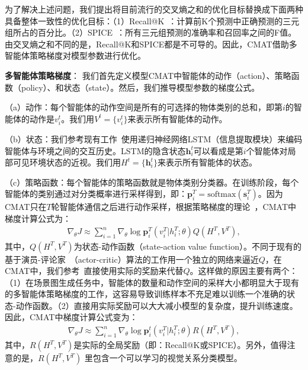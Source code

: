 为了解决上述问题，我们提出将目前流行的交叉熵之和的优化目标替换成下面两种具备整体一致性的优化目标：（1）Recall@K~\cite{lu2016visual}：计算前K个预测中正确预测的三元组所占的百分比。（2）SPICE~\cite{anderson2016spice}：所有三元组预测的准确率和召回率之间的F值。由交叉熵之和不同的是，Recall@K和SPICE都是不可导的。因此，CMAT借助多智能体策略梯度对模型参数进行优化。


\textbf{多智能体策略梯度}：
我们首先定义模型CMAT中智能体的动作（action）、策略函数（policy）、和状态（state）。然后，我们推导模型参数的梯度公式。

（a）动作：每个智能体的动作空间是所有的可选择的物体类别的总和，即第$i$的智能体的动作是$v^t_i$。我们用$V^t = \{v^t_i\}$来表示所有智能体的动作。

（b）状态：我们参考现有工作~\cite{hausknecht2015deep}使用递归神经网络LSTM（信息提取模块）来编码智能体与环境之间的交互历史。LSTM的隐含状态$\bm{h}^t_i$可以看成是第$i$个智能体对局部可见环境状态的近视。我们用$H^t = \{\bm{h}^t_i\}$来表示所有智能体的状态。


（c）策略函数：每个智能体的策略函数就是物体类别分类器。在训练阶段，每个智能体的类别通过对分类概率进行采样得到，即：$\bm{p}^T_i = \text{softmax}(\bm{s}^T_i)$。因为CMAT只在$T$轮智能体通信之后进行动作采样，根据策略梯度的理论~\cite{sutton2000policy}，CMAT中梯度计算公式为：
\begin{align}
\nabla_{\theta} J \approx \sum^n_{i=1} \nabla_{\theta} \log \bm{p}^T_i (v^T_i|h^T_i; \theta)Q(H^T, V^T),
\end{align}
其中，$Q(H^T, V^T)$为状态-动作函数（state-action value function）。不同于现有的基于演员-评论家~\cite{bahdanau2017actor,lowe2017multi,konda2000actor}（actor-critic）算法的工作用一个独立的网络来逼近$Q$，在CMAT中，我们参考~\cite{rao2018learning}直接使用实际的奖励来代替$Q$。这样做的原因主要有两个：（1）在场景图生成任务中，智能体的数量和动作空间的采样大小都明显大于现有的多智能体策略梯度的工作，这容易导致训练样本不充足难以训练一个准确的状态-动作函数。（2）直接用实际奖励可以大大减小模型的复杂度，提升训练速度。因此，CMAT中梯度计算公式变为：
\begin{align} \label{ch4:eq:eq_7}
\nabla_{\theta} J \approx \sum^n_{i=1} \nabla_{\theta} \log \bm{p}^t_i (v^T_i|h^T_i; \theta) R(H^T, V^T),
\end{align}
其中，$R(H^T, V^T)$是实际的全局奖励（即：Recall@K或SPICE）。另外，值得注意的是，$R(H^T, V^T)$ 里包含一个可以学习的视觉关系分类模型。


